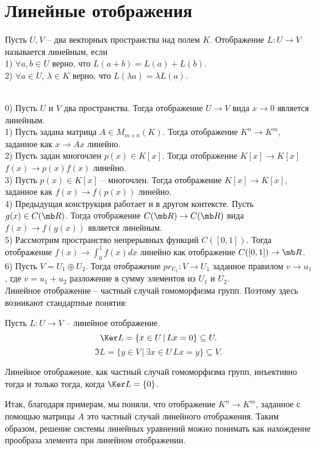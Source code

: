 \section{Линейные отображения}

 Пусть $U,V$ -- два векторных пространства над полем $K$. Отображение $L\colon U \to V$ называется линейным, если\\
1) $\forall a,b \in U$ верно, что $L(a+b)=L(a)+L(b)$.\\
2) $\forall a \in U$, $\lambda \in K$ верно, что $L(\lambda a)=\lambda L(a)$.
\edfn



\exm\\
0) Пусть $U$ и $V$ два пространства. Тогда отображение $U \to V$ вида $x \to 0$ является линейным.\\
1) Пусть задана матрица $A \in M_{m\times n}(K)$. Тогда отображение $K^n \to K^m$, заданное как $x \to Ax$ линейно.\\
2) Пусть задан многочлен $p(x) \in K[x]$. Тогда отображение $K[x] \to K[x]$ $f(x)\to p(x)f(x)$ линейно.\\
3) Пусть $p(x) \in K[x]$ -- многочлен. Тогда отображение $K[x] \to K[x]$, заданное как  $f(x)\to f(p(x))$ линейно.\\
4) Предыдущая конструкция работает и в другом контексте. Пусть $g(x)\in C(\mb R)$. Тогда отображение $C(\mb R)\to C(\mb R)$ вида $f(x)\to f(g(x))$ является линейным.\\
5) Рассмотрим пространство непрерывных функций $C([0,1])$. Тогда отображение $f(x) \to \int_{0}^1 f(x)dx$ линейно  как отображение $C([0,1])\to \mb R$.\\
6) Пусть $V=U_1\oplus U_2$. Тогда отображение $pr_{U_1} \colon V \to U_1$ заданное правилом $v \to u_1$, где $v=u_1+u_2$ разложение в сумму элементов из  $U_1$ и $U_2$.\\


Линейное отображение -- частный случай гомоморфизма групп. Поэтому здесь возникают стандартные понятия:






 Пусть $L\colon U \to V$ -- линейное отображение. 
$$\Ker L=\{x\in U\,|\, Lx=0\}\subseteq U.$$
$$\Im L=\{y\in V\,|\, \exists x\in U\, Lx=y\}\subseteq V.$$
\edfn

\rm Линейное отображение, как частный случай гомоморфизма групп, инъективно тогда и только тогда, когда $\Ker L=\{0\}$.
\erm

Итак, благодаря примерам, мы поняли, что отображение $K^n \to K^m$, заданное с помощью матрицы $A$ это частный случай линейного отображения. Таким образом, решение системы линейных уравнений можно понимать как нахождение прообраза элемента при линейном отображении.

